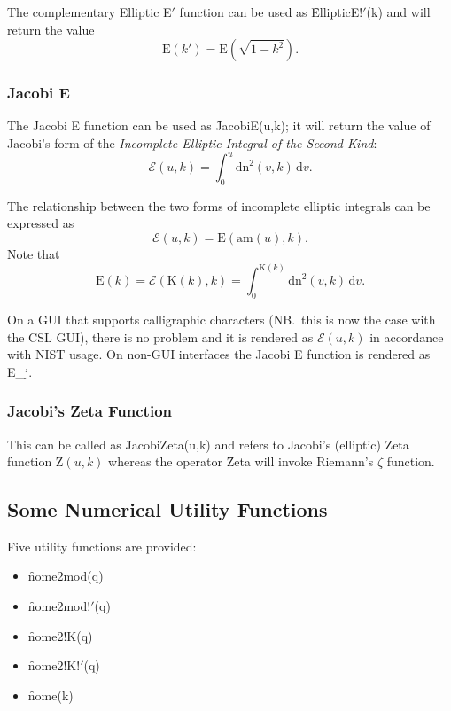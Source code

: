 The complementary Elliptic E$'$ function can be used as \f{EllipticE!$'$(k)}
and will return the value
\[\mathrm{E}(k') = \mathrm{E}(\sqrt{1-k^2}).\]

\subsubsection{Jacobi E}
\hypertarget{operator:JACOBIE}{}
The Jacobi E function can be used as  \f{JacobiE(u,k)};
it will return the value of Jacobi's form of
the \emph{Incomplete Elliptic Integral of the Second Kind}:
\[\mathcal{E}(u, k)=\int_0^u \mathrm{dn}^2 (v, k) \,\mathrm{d}v.\]

The relationship between the two forms of incomplete elliptic integrals can
be expressed as
\[\mathcal{E}(u, k) = \mathrm{E}(\mathrm{am}(u), k).\]
Note that
\[\mathrm{E}(k)=\mathcal{E}(\mathrm{K}(k), k)
=\int_0^{\mathrm{K}(k)} \mathrm{dn}^2(v, k) \,\mathrm{d}v.\]

On a GUI that supports calligraphic characters (NB.\ this is now the case with the
CSL GUI), there is no problem and it is rendered as $\mathcal{E}(u,k)$
in accordance with NIST usage.
On non-GUI interfaces the Jacobi E function is rendered as E\_j.

%
%

\subsubsection{Jacobi's Zeta Function}
\hypertarget{operator:JACOBIZETA}{}

This can be called as \f{JacobiZeta(u,k)} and refers to Jacobi's (elliptic)
Zeta function $\mathrm{Z}(u,k)$ whereas the operator \f{Zeta} will invoke
Riemann's $\zeta$ function.


\subsection{Some Numerical Utility Functions}
\hypertarget{operator:nome}{}
\hypertarget{ELLIPNOME}{}
 

Five utility functions are provided:
\begin{itemize}
\item \f{nome2mod(q)}
\item \f{nome2mod!$'$(q)}
\item \f{nome2!K(q)}
\item \f{nome2!K!$'$(q)}
\item \f{nome(k)}
\end{itemize}

